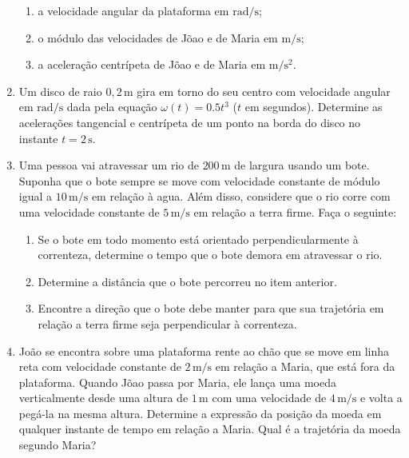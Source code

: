 \documentclass[fontsize=12pt]{scrartcl}
\newcommand{\un}[1]{\mathrm{#1}}
\begin{document}
\begin{enumerate}
\begin{enumerate}
  \item a velocidade angular da plataforma em $\un{rad}/\un s$;
  \item o módulo das velocidades de Jõao e de Maria em $\un m/\un s$;
  \item a aceleração centrípeta de Jõao e de Maria em
    $\un m/\un{s}^2$.
  \end{enumerate}
\item Um disco de raio $0,2\,\un m$ gira em torno do seu centro com
  velocidade angular em $\un{rad}/\un s$ dada pela equação
  $\omega(t)=0.5t^3$ ($t$ em segundos). Determine as acelerações
  tangencial e centrípeta de um ponto na borda do disco no instante
  $t=2\,\un s$.
\item Uma pessoa vai atravessar um rio de $200\,\un m$ de largura
  usando um bote. Suponha que o bote sempre se move com velocidade
  constante de módulo igual a $10\,\un m/\un s$ em relação à
  agua. Além disso, considere que o rio corre com uma velocidade
  constante de $5\,\un m/\un s$ em relação a terra firme. Faça o
  seguinte:
  \begin{enumerate}
  \item Se o bote em todo momento está orientado perpendicularmente à
    correnteza, determine o tempo que o bote demora em atravessar o
    rio.
  \item Determine a distância que o bote percorreu no item anterior.
  \item Encontre a direção que o bote debe manter para que sua
    trajetória em relação a terra firme seja perpendicular à
    correnteza.
  \end{enumerate}
\item João se encontra sobre uma plataforma rente ao chão que se move
  em linha reta com velocidade constante de $2\,\un m/\un s$ em
  relação a Maria, que está fora da plataforma. Quando Jõao passa por
  Maria, ele lança uma moeda verticalmente desde uma altura de
  $1\,\un m$ com uma velocidade de $4\,\un m/\un s$ e volta a pegá-la
  na mesma altura. Determine a expressão da posição da moeda em
  qualquer instante de tempo em relação a Maria. Qual é a trajetória
  da moeda segundo Maria?
\end{enumerate}
\end{document}
